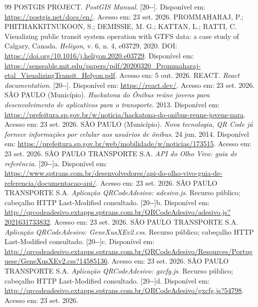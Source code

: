 \documentclass[12pt,oneside,a4paper,brazil,chapter=TITLE]{abntex2}
\begin{document}
\begin{thebibliography}{99}
 POSTGIS PROJECT. \textit{PostGIS Manual}. [20\mbox{-}\mbox{-}]. Disponível em: \url{https://postgis.net/docs/en/}. Acesso em: 23 set. 2026.
 PROMMAHARAJ, P.; PHITHAKKITNUKOON, S.; DEMISSIE, M. G.; KATTAN, L.; RATTI, C. Visualizing public transit system operation with GTFS data: a case study of Calgary, Canada. \textit{Heliyon}, v. 6, n. 4, e03729, 2020. DOI: \url{https://doi.org/10.1016/j.heliyon.2020.e03729}. Disponível em: \url{https://senseable.mit.edu/papers/pdf/20200320_Prommaharaj-etal_VisualizingTransit_Helyon.pdf}. Acesso em: 5 out. 2026.
 REACT. \textit{React documentation}. [20\mbox{-}\mbox{-}]. Disponível em: \url{https://react.dev/}. Acesso em: 23 set. 2026.
 SÃO PAULO (Município). \textit{Hackatona do Ônibus reúne jovens para desenvolvimento de aplicativos para o transporte}. 2013. Disponível em: \url{https://prefeitura.sp.gov.br/w/noticia/hackatona-do-onibus-reune-jovens-para}. Acesso em: 23 set. 2026.
 SÃO PAULO (Município). \textit{Nova tecnologia, QR Code já fornece informações por celular aos usuários de ônibus}. 24 jun. 2014. Disponível em: \url{https://prefeitura.sp.gov.br/web/mobilidade/w/noticias/173515}. Acesso em: 23 set. 2026.
 SÃO PAULO TRANSPORTE S.A. \textit{API do Olho Vivo: guia de referência}. [20\mbox{-}\mbox{-}]a. Disponível em: \url{https://www.sptrans.com.br/desenvolvedores/api-do-olho-vivo-guia-de-referencia/documentacao-api/}. Acesso em: 23 set. 2026.
 SÃO PAULO TRANSPORTE S.A. \textit{Aplicação QRCodeAdesivo: adesivo.js}. Recurso público; cabeçalho HTTP Last-Modified consultado. [20\mbox{-}\mbox{-}]b. Disponível em: \url{http://qrcodeadesivo.extapps.sptrans.com.br/QRCodeAdesivo/adesivo.js?2021631733832}. Acesso em: 23 set. 2026.
 SÃO PAULO TRANSPORTE S.A. \textit{Aplicação QRCodeAdesivo: GeneXusXEv2.css}. Recurso público; cabeçalho HTTP Last-Modified consultado. [20\mbox{-}\mbox{-}]c. Disponível em: \url{http://qrcodeadesivo.extapps.sptrans.com.br/QRCodeAdesivo/Resources/Portuguese/GeneXusXEv2.css?14585136}. Acesso em: 23 set. 2026.
 SÃO PAULO TRANSPORTE S.A. \textit{Aplicação QRCodeAdesivo: gxcfg.js}. Recurso público; cabeçalho HTTP Last-Modified consultado. [20\mbox{-}\mbox{-}]d. Disponível em: \url{http://qrcodeadesivo.extapps.sptrans.com.br/QRCodeAdesivo/gxcfg.js?54798}. Acesso em: 23 set. 2026.

\end{thebibliography}
\end{document}
